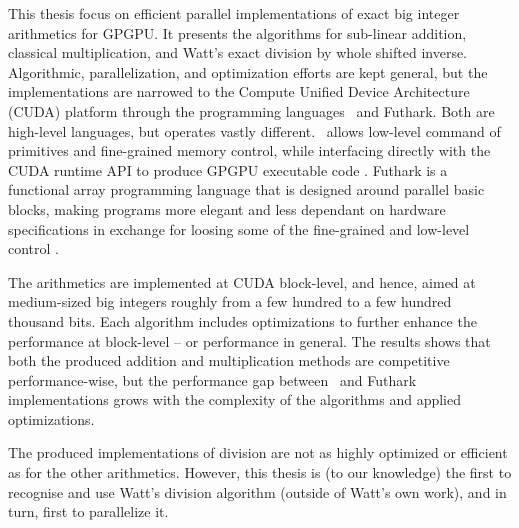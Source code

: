 This thesis focus on efficient parallel implementations of exact big integer
arithmetics for GPGPU. It presents the algorithms for sub-linear addition,
classical multiplication, and Watt's exact division by whole shifted
inverse. Algorithmic, parallelization, and optimization efforts are kept
general, but the implementations are narrowed to the Compute Unified Device
Architecture (CUDA) platform through the programming languages \cpp\ and
Futhark. Both are high-level languages, but operates vastly different. \cpp\
allows low-level command of primitives and fine-grained memory control, while
interfacing directly with the CUDA runtime API to produce GPGPU executable code
\cite{cudaguide, stroustrup}. Futhark is a functional array programming language
that is designed around parallel basic blocks, making programs more elegant and
less dependant on hardware specifications in exchange for loosing some of the
fine-grained and low-level control \cite{ParallelProgrammingInFuthark,
  Henriksen:2017:FPF:3062341.3062354}.

The arithmetics are implemented at CUDA block-level, and hence, aimed at
medium-sized big integers roughly from a few hundred to a few hundred thousand
bits. Each algorithm includes optimizations to further enhance the performance
at block-level -- or performance in general. The results shows that both the
produced addition and multiplication methods are competitive performance-wise,
but the performance gap between \cpp\ and Futhark implementations grows with the
complexity of the algorithms and applied optimizations.

The produced implementations of division are not as highly optimized or
efficient as for the other arithmetics. However, this thesis is (to our
knowledge) the first to recognise and use Watt's division algorithm (outside of
Watt's own work), and in turn, first to parallelize it.


